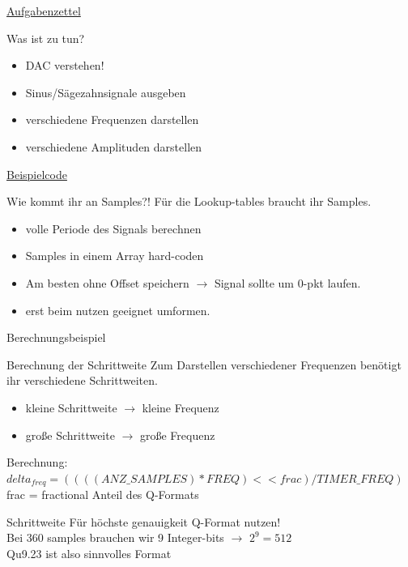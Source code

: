 \documentclass[aspectratio=169,presentation]{beamer}
\newcommand{\sectionframe}[1]{
	\begin{frame}
		\vfill
		\Huge
		\centering
		\usebeamercolor[fg]{title}
		#1
		\vfill
		\par
	\end{frame}
}
\begin{document}
\sectionframe{\href{http://users.informatik.haw-hamburg.de/~schafers/LOCAL/S19S_CE/Aufgabenzettel_Nr3_v06_Entwurf.pdf}{Aufgabenzettel}}

\begin{frame} {Was ist zu tun?}
  \begin{itemize}
    \item DAC verstehen!
    \item Sinus/Sägezahnsignale ausgeben
    \item verschiedene Frequenzen darstellen
    \item verschiedene Amplituden darstellen
  \end{itemize}
\end{frame}

\sectionframe{\href{https://users.informatik.haw-hamburg.de/~schafers/LOCAL/S19S_CE/CODE/DemoForLabA3_Curve/main.c}{Beispielcode}}

\begin{frame} {Wie kommt ihr an Samples?!}
  Für die Lookup-tables braucht ihr Samples.
  \begin{itemize}
    \item volle Periode des Signals berechnen
    \item Samples in einem Array hard-coden
    \item Am besten ohne Offset speichern $\rightarrow$ Signal sollte um 0-pkt laufen.
    \item erst beim nutzen geeignet umformen. 
  \end{itemize}
\end{frame}

\sectionframe{Berechnungsbeispiel}

\begin{frame} {Berechnung der Schrittweite}
  Zum Darstellen verschiedener Frequenzen benötigt ihr verschiedene Schrittweiten.
  \begin{itemize}
    \item kleine Schrittweite $\rightarrow$ kleine Frequenz
    \item große Schrittweite $\rightarrow$ große Frequenz
  \end{itemize}
  \vspace{0.5cm}
  Berechnung:\\
  $delta_{freq} = ((((ANZ\_SAMPLES) * FREQ) << frac) / TIMER\_FREQ)$\\
  frac = fractional Anteil des Q-Formats
\end{frame}

\begin{frame} {Schrittweite}
  Für höchste genauigkeit Q-Format nutzen!\\
  \vspace{0.5cm}
  \pause
  Bei 360 samples brauchen wir 9 Integer-bits $\rightarrow$ $2^9 = 512$ \\
  \vspace{0.5cm}
  Qu9.23 ist also sinnvolles Format
\end{frame}
\end{document}
